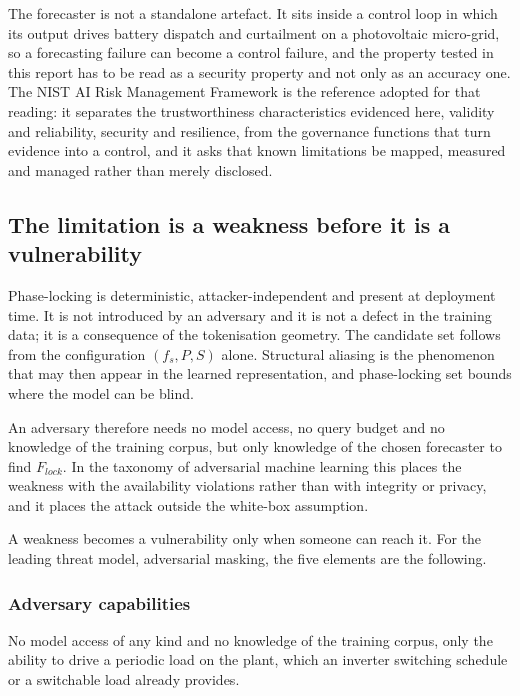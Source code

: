 The forecaster is not a standalone artefact. It sits inside a control loop in which its output drives battery dispatch and curtailment on a photovoltaic micro-grid, so a forecasting failure can become a control failure, and the property tested in this report has to be read as a security property and not only as an accuracy one. The NIST AI Risk Management Framework\autocite{tabassiArtificialIntelligenceRisk2023} is the reference adopted for that reading: it separates the trustworthiness characteristics evidenced here, validity and reliability, security and resilience, from the governance functions that turn evidence into a control, and it asks that known limitations be mapped, measured and managed rather than merely disclosed.

\subsection{The limitation is a weakness before it is a vulnerability}

Phase-locking is deterministic, attacker-independent and present at deployment time. It is not introduced by an adversary and it is not a defect in the training data; it is a consequence of the tokenisation geometry. The candidate set follows from the configuration $(f_s,P,S)$ alone. Structural aliasing is the phenomenon that may then appear in the learned representation, and phase-locking set bounds where the model can be blind.

An adversary therefore needs no model access, no query budget and no knowledge of the training corpus, but only knowledge of the chosen forecaster to find $F_{lock}$. In the taxonomy of adversarial machine learning\autocite{vassilevAdversarialMachineLearning2024} this places the weakness with the availability violations rather than with integrity or privacy, and it places the attack outside the white-box assumption.

A weakness becomes a vulnerability only when someone can reach it. For the leading threat model, adversarial masking, the five elements are the following. 

\subsubsection{Adversary capabilities}

No model access of any kind and no knowledge of the training corpus, only the ability to drive a periodic load on the plant, which an inverter switching schedule or a switchable load already provides.

